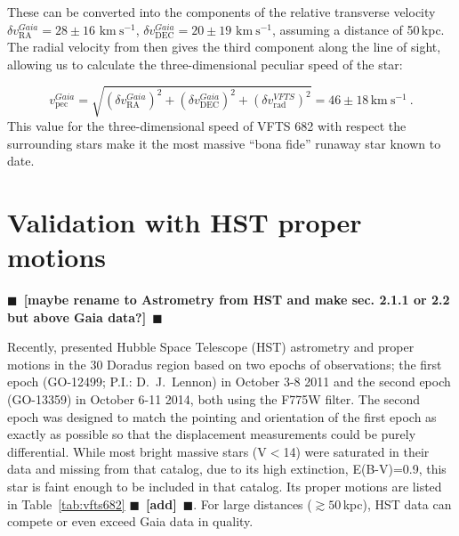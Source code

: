 \documentclass[apjl,twocolumn]{emulateapj}
\newcommand{\todo}[1]{{\large $\blacksquare$~\textbf{\color{red}[#1]}}~$\blacksquare$}
\newcommand{\kms}{{\,\mathrm{km\ s^{-1}}}}
\DeclareRobustCommand{\Tabref}[1]{Table~\ref{#1}}
\begin{document}
These can be converted into
the components of the relative transverse velocity $\delta v_\mathrm{RA}^{Gaia}=28\pm16\,\kms$,
$\delta v_\mathrm{DEC}^{Gaia}=20\pm19\,\kms$, assuming a distance of
50\,kpc. %
The radial velocity from
\cite{bestenlehner:11} then gives the third component along
the line of sight, allowing us to calculate the three-dimensional
peculiar speed of the star:

\begin{equation}
  \label{eq:speed_around}
  v_\mathrm{pec}^{Gaia} = \sqrt{\left(\delta v_\mathrm{RA}^{Gaia}\right)^2
    +\left(\delta v_\mathrm{DEC}^{Gaia}\right)^2+\left(\delta
      v_\mathrm{rad}^{VFTS}\right)^2} = 46 \pm 18 
  \kms \ .
\end{equation}
This value for the three-dimensional speed of VFTS 682 with respect the
surrounding stars make it the most massive ``bona fide'' runaway star
known to date.



\section{Validation with HST proper motions}
\todo{maybe rename to Astrometry from HST and make sec. 2.1.1 or 2.2
  but above Gaia data?}

Recently, \citet{platais:18} presented Hubble Space Telescope (HST)  astrometry and proper
motions in the 30 Doradus region based on two epochs of
observations; the first epoch (GO-12499; P.I.: D.~J.~Lennon)
in October 3-8 2011 and the second epoch (GO-13359) in
October 6-11 2014, both using the F775W filter.
The second epoch was designed to match the pointing and
orientation of the first epoch as exactly as possible so
that the displacement measurements could be purely differential.
While most bright massive stars (V$<$14) were saturated in
their data and missing from that catalog, due to its
high extinction, E(B-V)=0.9, this star is faint enough
to be included in that catalog. Its proper motions are
listed in \Tabref{tab:vfts682} \todo{add}. For
large distances ($\gtrsim50$\,kpc), HST data can compete or even
exceed Gaia data in quality.



\end{document}
